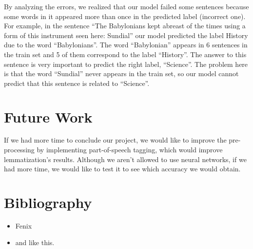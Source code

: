 \documentclass[11pt]{article}
\begin{document}
By analyzing the errors, we realized that our model failed some sentences because some words in it appeared more than once in the predicted label (incorrect one). For example, in the sentence “The Babylonians kept abreast of the times using a form of this instrument seen here: Sundial” our model predicted the label History due to the word “Babylonians”. The word “Babylonian” appears in 6 sentences in the train set and 5 of them correspond to the label “History”. The answer to this sentence is very important to predict the right label, “Science”. The problem here is that the word “Sundial” never appears in the train set, so our model cannot predict that this sentence is related to “Science”.


\section{Future Work}

If we had more time to conclude our project, we would like to improve the pre-processing by implementing part-of-speech tagging, which would improve lemmatization’s results.
Although we aren’t allowed to use neural networks, if we had more time, we would like to test it to see which accuracy we would obtain.

\section{Bibliography}

\begin{itemize}
\item Fenix
\item and like this.
\end{itemize}
\end{document}
